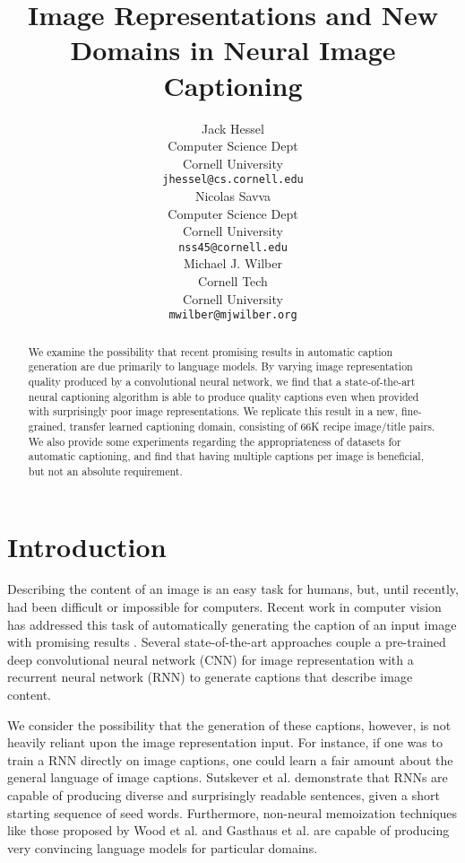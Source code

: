 \documentclass[11pt]{article}
\title{Image Representations and New Domains in Neural Image Captioning}
\author{
Jack Hessel\\
Computer Science Dept\\
Cornell University\\
\texttt{jhessel@cs.cornell.edu} \\
\And
Nicolas Savva\\
Computer Science Dept\\
Cornell University\\
\texttt{nss45@cornell.edu} \\
\And
Michael J. Wilber\\
Cornell Tech\\
Cornell University\\
\texttt{mwilber@mjwilber.org}\\
}
\date{}
\begin{document}
\maketitle
\begin{abstract}
  We examine the possibility that recent promising results in
  automatic caption generation are due primarily to language
  models. By varying image representation quality produced by a
  convolutional neural network, we find that a state-of-the-art neural
  captioning algorithm is able to produce quality captions even when
  provided with surprisingly poor image representations. We replicate
  this result in a new, fine-grained, transfer learned captioning
  domain, consisting of 66K recipe image/title pairs. We also provide
  some experiments regarding the appropriateness of datasets for
  automatic captioning, and find that having multiple captions per
  image is beneficial, but not an absolute requirement.
\end{abstract}

\section{Introduction}
Describing the content of an image is an easy task for humans, but,
until recently, had been difficult or impossible for computers. Recent
work in computer vision has addressed this task of automatically
generating the caption of an input image with promising results
\cite{farhadi2010every,kulkarni2013babytalk,ordonez2011im2text,karpathy2014deep,mao2014explain,vinyals2014show,kiros2014unifying,donahue2014long,fang2014captions}. Several
state-of-the-art approaches couple a pre-trained deep convolutional
neural network (CNN) for image representation with a recurrent neural
network (RNN) to generate captions that describe image content.

We consider the possibility that the generation of these captions,
however, is not heavily reliant upon the image representation
input. For instance, if one was to train a RNN directly on image
captions, one could learn a fair amount about the general language of
image captions. Sutskever et al. 
demonstrate that RNNs are capable of producing diverse and
surprisingly readable sentences, given a short starting sequence of
seed words. Furthermore, non-neural memoization techniques like those
proposed by Wood et al.  and Gasthaus et
al.  are capable of producing very
convincing language models for particular domains.
\end{document}
